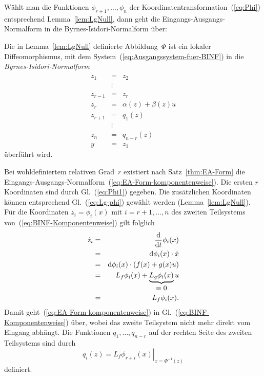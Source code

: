 Wählt man die Funktionen $\phi_{r+1},\ldots,\phi_{n}$ der Koordinatentransformation~(\ref{eq:Phi})
entsprechend Lemma~\ref{lem:LgNull}, dann geht die Eingangs-Ausgangs-Normalform
in die Byrnes-Isidori-Normalform über:
\begin{theorem}
\label{thm:Byrnes-Isidori-Normalform}Die in Lemma~\ref{lem:LgNull}
definierte Abbildung~$\Phi$ ist ein lokaler Diffeomorphismus, mit
dem System~(\ref{eq:Ausgangssystem-fuer-BINF}) in die \emph{Byrnes-Isidori-Normalform}
\begin{equation}
\begin{array}{lcl}
\dot{z}_{1} & = & z_{2}\\
 & \vdots\\
\dot{z}_{r-1} & = & z_{r}\\
\dot{z}_{r} & = & \alpha(z)+\beta(z)u\\
\dot{z}_{r+1} & = & q_{1}(z)\\
 & \vdots\\
\dot{z}_{n} & = & q_{n-r}(z)\\
y & = & z_{1}
\end{array}\label{eq:BINF-Komponentenweise}
\end{equation}
überführt wird.
\end{theorem}
\begin{svmultproof2}
Bei wohldefiniertem relativen Grad~$r$ existiert nach Satz~\ref{thm:EA-Form}
die Eingangs-Ausgangs-Normalform~(\ref{eq:EA-Form-komponentenweise}).
Die ersten $r$ Koordinaten sind durch Gl.~(\ref{eq:Phi1}) gegeben.
Die zusätzlichen Koordinaten können entsprechend Gl.~(\ref{eq:Lg-phi})
gewählt werden (Lemma~\ref{lem:LgNull}). Für die Koordinaten $z_{i}=\phi_{i}(x)$
mit $i=r+1,\ldots,n$ des zweiten Teilsystems von~(\ref{eq:BINF-Komponentenweise})
gilt folglich
\begin{eqnarray*}
\dot{z}_{i} & = & \frac{{\mathrm{d}}}{{\mathrm{d}} t}\phi_{i}(x)\\
 & = & {\mathrm{d}}\phi_{i}(x)\cdot\dot{x}\\
 & = & {\mathrm{d}}\phi_{i}(x)\cdot\left(f(x)+g(x)u\right)\\
 & = & L_{f}\phi_{i}(x)+\underbrace{L_{g}\phi_{i}(x)}_{{\displaystyle \equiv\mbox{0}}}u\\
 & = & L_{f}\phi_{i}(x).
\end{eqnarray*}
Damit geht~(\ref{eq:EA-Form-komponentenweise}) in Gl.~(\ref{eq:BINF-Komponentenweise})
über, wobei das zweite Teilsystem nicht mehr direkt vom Eingang abhängt.
Die Funktionen $q_{1},\ldots,q_{n-r}$ auf der rechten Seite des zweiten
Teilsystems sind durch 
\[
q_{i}(z)=\left.L_{f}\phi_{r+i}(x)\right|_{x=\Phi^{-1}(z)}
\]
definiert.
\end{svmultproof2}

